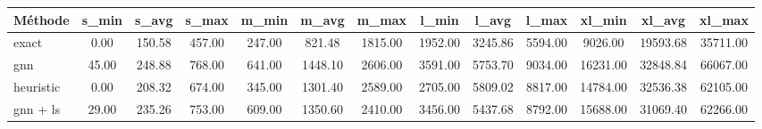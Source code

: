 \begin{tabular}{lcccccccccccc}
\toprule
Méthode & s_min & s_avg & s_max & m_min & m_avg & m_max & l_min & l_avg & l_max & xl_min & xl_avg & xl_max \\
\midrule
exact & 0.00 & 150.58 & 457.00 & 247.00 & 821.48 & 1815.00 & 1952.00 & 3245.86 & 5594.00 & 9026.00 & 19593.68 & 35711.00 \\
gnn & 45.00 & 248.88 & 768.00 & 641.00 & 1448.10 & 2606.00 & 3591.00 & 5753.70 & 9034.00 & 16231.00 & 32848.84 & 66067.00 \\
heuristic & 0.00 & 208.32 & 674.00 & 345.00 & 1301.40 & 2589.00 & 2705.00 & 5809.02 & 8817.00 & 14784.00 & 32536.38 & 62105.00 \\
gnn + ls & 29.00 & 235.26 & 753.00 & 609.00 & 1350.60 & 2410.00 & 3456.00 & 5437.68 & 8792.00 & 15688.00 & 31069.40 & 62266.00 \\
\bottomrule
\end{tabular}
